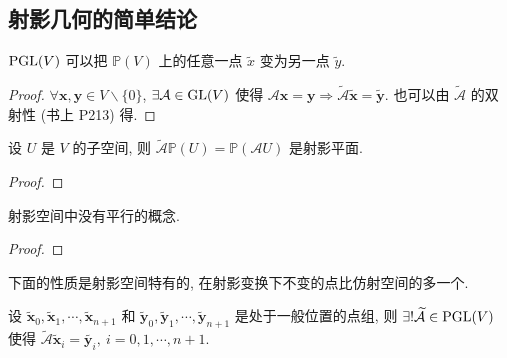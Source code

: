 \documentclass[color=black,device=normal,lang=cn,mode=geye]{elegantnote}
\begin{document}
\subsection{射影几何的简单结论}
\begin{theorem}
    $\operatorname{PGL} (V)$ 可以把 $\mathbb{P}(V)$ 上的任意一点 $\tilde{x}$ 变为另一点 $\tilde{y}$.
\end{theorem}
\begin{proof}
    $\forall\boldsymbol{x},\boldsymbol{y}\in V\backslash\{0\}$, $\exists\mathcal{A}\in\operatorname{GL} (V)$ 使得 $\mathcal{A}\boldsymbol{x}=\boldsymbol{y}\Rightarrow\widetilde{\mathcal{A}}\tilde{\boldsymbol{x}}=\tilde{\boldsymbol{y}}$. 也可以由 $\widetilde{\mathcal{A}}$ 的双射性 (书上 P213) 得.
\end{proof}
\begin{theorem}
    设 $U$ 是 $V$ 的子空间, 则 $\widetilde{\mathcal{A}}\mathbb{P}(U)=\mathbb{P}(\mathcal{A}U)$ 是射影平面.
\end{theorem}
\begin{proof}
    
\end{proof}
\begin{theorem}
    射影空间中没有平行的概念.
\end{theorem}
\begin{proof}
    
\end{proof}
下面的性质是射影空间特有的, 在射影变换下不变的点比仿射空间的多一个.
\begin{theorem}[书上的定理 3]\label{t3.10}
    设 $\tilde{\boldsymbol{x}}_0,\tilde{\boldsymbol{x}}_1,\cdots,\tilde{\boldsymbol{x}}_{n+1}$ 和 $\tilde{\boldsymbol{y}}_0,\tilde{\boldsymbol{y}}_1,\cdots,\tilde{\boldsymbol{y}}_{n+1}$ 是处于一般位置的点组, 则 $\exists!\widetilde{\mathcal{A}}\in\operatorname{PGL} (V)$ 使得 $\widetilde{\mathcal{A}}\tilde{\boldsymbol{x}}_i=\tilde{\boldsymbol{y}_i},\ i=0,1,\cdots,n+1$.
\end{theorem}
\end{document}
